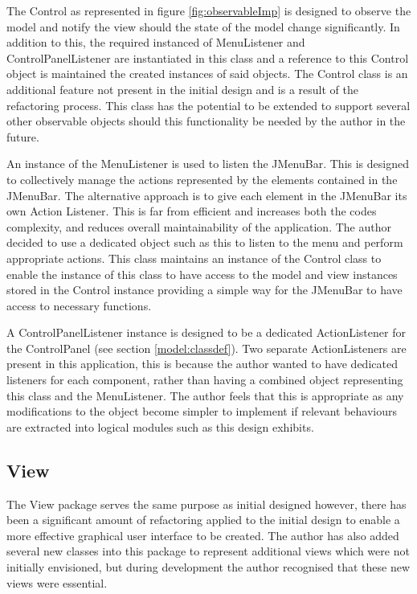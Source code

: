 The Control as represented in figure \ref{fig:observableImp} is designed to observe the model and notify the view should the state of the model change significantly. In addition to this, the required instanced of MenuListener and ControlPanelListener are instantiated in this class and a reference to this Control object is maintained the created instances of said objects. The Control class is an additional feature not present in the initial design and is a result of the refactoring process. This class has the potential to be extended to support several other observable objects should this functionality be needed by the author in the future.

An instance of the MenuListener is used to listen the JMenuBar. This is designed to collectively manage the actions represented by the elements contained in the JMenuBar. The alternative approach is to give each element in the JMenuBar its own Action Listener. This is far from efficient and increases both the codes complexity, and reduces overall maintainability of the application. The author decided to use a dedicated object such as this to listen to the menu and perform appropriate actions. This class maintains an instance of the Control class to enable the instance of this class to have access to the model and view instances stored in the Control instance providing a simple way for the JMenuBar to have access to necessary functions.

A ControlPanelListener instance is designed to be a dedicated ActionListener for the ControlPanel (see section \ref{model:classdef}). Two separate ActionListeners are present in this application, this is because the author wanted to have dedicated listeners for each component, rather than having a combined object representing this class and the MenuListener. The author feels that this is appropriate as any modifications to the object become simpler to implement if relevant behaviours are extracted into logical modules such as this design exhibits.

\subsection{View}

The View package serves the same purpose as initial designed however, there has been a significant amount of refactoring applied to the initial design to enable a more effective graphical user interface to be created. The author has also added several new classes into this package to represent additional views which were not initially envisioned, but during development the author recognised that these new views were essential.

